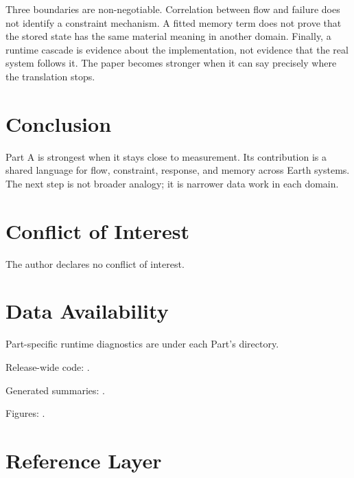 \documentclass[12pt,a4paper]{article}
\begin{document}
Three boundaries are non-negotiable. Correlation between flow and failure does
not identify a constraint mechanism. A fitted memory term does not prove that
the stored state has the same material meaning in another domain. Finally, a
runtime cascade is evidence about the implementation, not evidence that the
real system follows it. The paper becomes stronger when it can say precisely
where the translation stops.



\section{Conclusion}

Part A is strongest when it stays close to measurement. Its contribution is a
shared language for flow, constraint, response, and memory across Earth systems.
The next step is not broader analogy; it is narrower data work in each domain.

\section*{Conflict of Interest}
The author declares no conflict of interest.

\section*{Data Availability}
Part-specific runtime diagnostics are under each Part's  directory.

Release-wide code: .

Generated summaries: .

Figures: .


\section{Reference Layer}



\end{document}
